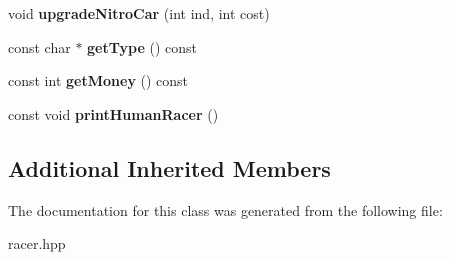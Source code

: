 \begin{DoxyCompactItemize}
\item 
void {\bfseries upgrade\+Nitro\+Car} (int ind, int cost)\hypertarget{classHumanRacer_a3b419ee76f450f0a4300d3978bbd0115}{}\label{classHumanRacer_a3b419ee76f450f0a4300d3978bbd0115}

\item 
const char $\ast$ {\bfseries get\+Type} () const \hypertarget{classHumanRacer_a820c041272b6db93f0b31b410aa89bd7}{}\label{classHumanRacer_a820c041272b6db93f0b31b410aa89bd7}

\item 
const int {\bfseries get\+Money} () const \hypertarget{classHumanRacer_a2f6255d9fc4079bf0e434b6a4f8884ce}{}\label{classHumanRacer_a2f6255d9fc4079bf0e434b6a4f8884ce}

\item 
const void {\bfseries print\+Human\+Racer} ()\hypertarget{classHumanRacer_aa1463bec9957a1e0e1246c969277c8e5}{}\label{classHumanRacer_aa1463bec9957a1e0e1246c969277c8e5}

\end{DoxyCompactItemize}
\subsection*{Additional Inherited Members}


The documentation for this class was generated from the following file\+:\begin{DoxyCompactItemize}
\item 
racer.\+hpp\end{DoxyCompactItemize}
